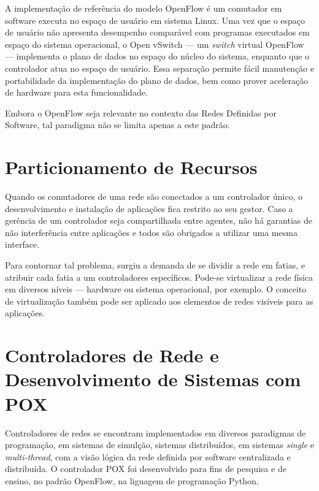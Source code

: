 A implementação de referência do modelo OpenFlow é um comutador em software executa no espaço de usuário em sistema Linux. Uma vez que o espaço de usuário não apresenta desempenho comparável com programas executados em espaço do sistema operacional, o Open vSwitch --- um \textit{switch} virtual OpenFlow --- implementa o plano de dados no espaço do núcleo do sistema, enquanto que o controlador atua no espaço de usuário. Essa separação permite fácil manutenção e portabilidade da implementação do plano de dados, bem como prover aceleração de hardware para esta funcionalidade.

Embora o OpenFlow seja relevante no contexto das Redes Definidas por Software, tal paradigma não se limita apenas a este padrão.


\section*{Particionamento de Recursos}

Quando os comutadores de uma rede são conectados a um controlador único, o desenvolvimento e instalação de aplicações fica restrito ao seu gestor. Caso a gerência de um controlador seja compartilhada entre agentes, não há garantias de não interferência entre aplicações e todos são obrigados a utilizar uma mesma interface.

Para contornar tal problema, surgiu a demanda de se dividir a rede em fatias, e atribuir cada fatia a um controladores específicos. Pode-se virtualizar a rede física em diversos níveis --- hardware ou sistema operacional, por exemplo. O conceito de virtualização também pode ser aplicado aos elementos de redes visíveis para as aplicações.


\section*{Controladores de Rede e Desenvolvimento de Sistemas com POX}

Controladores de redes se encontram implementados em diversos paradigmas de programação, em sistemas de simulção, sistemas distribuídos, em sistemas \textit{single} e \textit{multi-thread}, com a visão lógica da rede definida por software centralizada e distribuída. O controlador POX foi desenvolvido para fins de pesquisa e de ensino, no padrão OpenFlow, na liguagem de programação Python.

